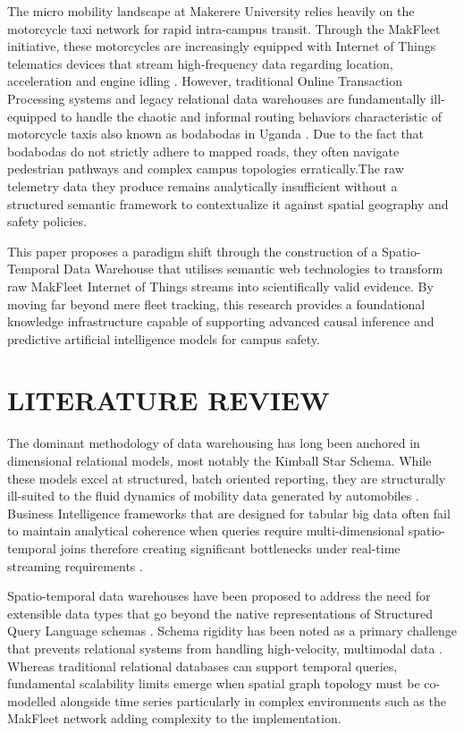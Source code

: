 \documentclass{ieeeaccess}
\begin{document}
The micro mobility landscape at Makerere University relies heavily on the motorcycle taxi network for rapid intra-campus transit. Through the
MakFleet initiative, these motorcycles are increasingly equipped with Internet of Things telematics devices that stream high-frequency
data regarding location, acceleration and engine idling
\cite{gubbi2013,chen2017}. However, traditional Online Transaction Processing  systems and legacy relational data warehouses are fundamentally ill-equipped to handle the chaotic and informal routing
behaviors characteristic of motorcycle taxis also known as bodabodas in Uganda \cite{kimball2013}. Due to the fact that  bodabodas do not strictly adhere to mapped roads, they often navigate pedestrian pathways and complex campus topologies
erratically.The raw telemetry data they produce remains analytically insufficient without
a structured semantic framework to contextualize it against spatial
geography and safety policies.

This paper proposes a paradigm shift through the construction of a Spatio-Temporal Data Warehouse that utilises semantic web technologies
to transform raw MakFleet Internet of Things streams into scientifically valid evidence. By moving far  beyond mere fleet tracking, this research provides a foundational knowledge infrastructure capable of supporting advanced causal inference and predictive artificial intelligence models for campus safety.


\section{LITERATURE REVIEW}
\label{sec:literature}


The dominant methodology of data warehousing has long been anchored in dimensional relational models, most notably the Kimball Star Schema.
While these models excel at structured, batch oriented reporting, they are structurally ill-suited to the fluid dynamics of mobility data generated by automobiles \cite{kimball2013,chen2012}. Business Intelligence frameworks that are  designed for tabular big data often fail to maintain analytical coherence when queries require multi-dimensional spatio-temporal joins therefore  creating significant bottlenecks under real-time streaming requirements \cite{liang2023survey}.

Spatio-temporal data warehouses have been proposed to address the need for extensible data types that go beyond the native representations of Structured Query Language  schemas \cite{pelekis2014}. Schema rigidity has been noted as a primary challenge that prevents relational systems from handling high-velocity, multimodal data \cite{hamdi2022}. Whereas  traditional relational databases can support temporal queries, fundamental scalability limits emerge when spatial graph topology must be co-modelled alongside time series particularly in complex environments such as the MakFleet network  adding complexity to the implementation\cite{pelekis2014}.
\end{document}
